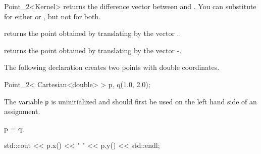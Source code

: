 \begin{ccRefClass} {Point_2<Kernel>}
       {returns the difference vector between  and . 
        You can substitute  for either  or ,
        but not for both.}

       {returns the point obtained by translating  by the 
        vector .}

       {returns the point obtained by translating  by the 
        vector -.}

\ccExample

The following declaration creates two points with
 double coordinates.

\begin{cprog}

  Point_2< Cartesian<double> > p, q(1.0, 2.0);
\end{cprog} 

The variable {\tt p} is uninitialized and should first be used on 
the left hand side of an assignment. 
\begin{cprog}

  p = q;

  std::cout << p.x() << "  " << p.y() << std::endl; 
\end{cprog} 


\ccSeeAlso
{}

\end{ccRefClass} 
